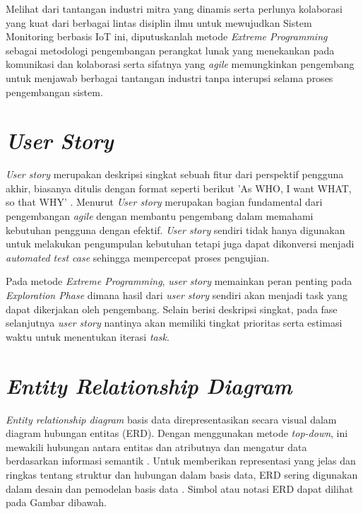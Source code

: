 Melihat dari tantangan industri mitra yang dinamis serta perlunya kolaborasi yang kuat dari berbagai lintas disiplin ilmu untuk mewujudkan Sistem Monitoring berbasis IoT ini, diputuskanlah metode \textit{Extreme Programming} sebagai metodologi pengembangan perangkat lunak yang menekankan pada komunikasi dan kolaborasi serta sifatnya yang \textit{agile} memungkinkan pengembang untuk menjawab berbagai tantangan industri tanpa interupsi selama proses pengembangan sistem.

\section{\textit{User Story}}

\textit{User story} merupakan deskripsi singkat sebuah fitur dari perspektif pengguna akhir, biasanya ditulis dengan format seperti berikut 'As WHO, I want WHAT, so that WHY' \parencite{article:dwitama}.  Menurut \textcite{inproc:raharjana} \textit{User story} merupakan bagian fundamental dari pengembangan \textit{agile} dengan membantu pengembang dalam memahami kebutuhan pengguna dengan efektif. \textit{User story} sendiri tidak hanya digunakan untuk melakukan pengumpulan kebutuhan tetapi juga dapat dikonversi menjadi \textit{automated test case} sehingga mempercepat proses pengujian.

Pada metode \textit{Extreme Programming}, \textit{user story} memainkan peran penting pada \textit{Exploration Phase} dimana hasil dari \textit{user story} sendiri akan menjadi task yang dapat dikerjakan oleh pengembang. Selain berisi deskripsi singkat, pada fase selanjutnya \textit{user story} nantinya akan memiliki tingkat prioritas serta estimasi waktu untuk menentukan iterasi \textit{task}.

\section{\textit{Entity Relationship Diagram}}

\textit{Entity relationship diagram} basis data direpresentasikan secara visual dalam diagram hubungan entitas (ERD). Dengan menggunakan metode \textit{top-down}, ini mewakili hubungan antara entitas dan atributnya dan mengatur data berdasarkan informasi semantik \parencite{article:chen}. Untuk memberikan representasi yang jelas dan ringkas tentang struktur dan hubungan dalam basis data, ERD sering digunakan dalam desain dan pemodelan basis data \parencite{article:supriyadi}. Simbol atau notasi ERD dapat dilihat pada Gambar dibawah.

